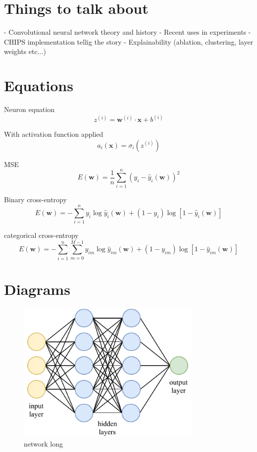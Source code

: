 \section{Things to talk about}
- Convolutional neural network theory and history
- Recent uses in experiments
- CHIPS implementation tellig the story
- Explainability (ablation, clustering, layer weights etc...)

\section{Equations}

Neuron equation
\begin{equation}
    z^{(i)}=\boldsymbol{w}^{(i)}\cdot\boldsymbol{x}+b^{(i)}
\end{equation}

With activation function applied
\begin{equation}
    a_{i}(\boldsymbol{x})=\sigma_i(z^{(i)})
\end{equation}

MSE
\begin{equation}
    E(\boldsymbol{w})=\frac{1}{n}\displaystyle\sum_{i=1}^{n}(y_{i}-\hat{y}_{i}(\boldsymbol{w}))^{2}
\end{equation}

Binary cross-entropy
\begin{equation}
    E(\boldsymbol{w})=-\displaystyle\sum_{i=1}^{n}y_{i}\log\hat{y}_{i}(\boldsymbol{w})+(1-y_{i})\log[1-\hat{y}_{i}(\boldsymbol{w})]
\end{equation}

categorical cross-entropy
\begin{equation}
    E(\boldsymbol{w})=-\displaystyle\sum_{i=1}^{n}\displaystyle\sum_{m=0}^{M-1}y_{im}\log\hat{y}_{im}(\boldsymbol{w})+(1-y_{im})\log[1-\hat{y}_{im}(\boldsymbol{w})]
\end{equation}

\section{Diagrams}

\begin{figure}
    \includegraphics[width=0.8\textwidth]{diagrams/6-cvn/network.pdf}
    \caption[network short]
    {network long}
    \label{fig:network}
\end{figure}


